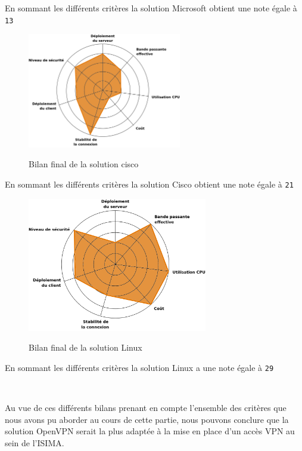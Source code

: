 En sommant les différents critères la solution Microsoft obtient une note égale à \verb|13|

\begin{figure}[H]
	\begin{center}
		\includegraphics[width=0.6\textwidth]{partie_3/images/cisco.png}\\
	\end{center}
	\caption{Bilan final de la solution cisco}
	\label{Graphe Cisco}
\end{figure}

En sommant les différents critères la solution Cisco obtient une note égale à \verb|21|

\begin{figure}[H]
	\begin{center}
		\includegraphics[width=0.7\textwidth]{partie_3/images/linux.png}\\
	\end{center}
	\caption{Bilan final de la solution Linux}
	\label{Graphe linux}
\end{figure}

En sommant les différents critères la solution Linux a une note égale à \verb|29|

~

Au vue de ces différents bilans prenant en compte l'ensemble des critères que nous avons pu aborder au cours de cette partie, nous pouvons conclure que la solution OpenVPN serait la plus adaptée à la mise en place d'un accès VPN au sein de l'ISIMA.
